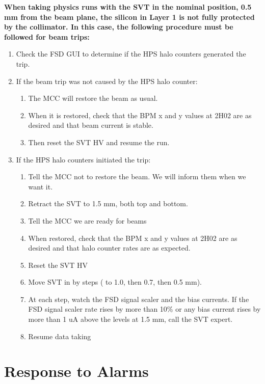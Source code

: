 \documentclass[12pt]{report}
\begin{document}
\textbf{When taking physics runs with the SVT in  the nominal position, 0.5 mm from the beam plane, the silicon in Layer 1 is not fully protected by the collimator.  In this case, the following procedure must be followed for beam trips:}
\begin{enumerate}
\item Check the FSD GUI to determine if the HPS halo counters generated the trip.
\item If the beam trip was not caused by the HPS halo counter:
\begin {enumerate}
\item The MCC will restore the beam as usual.
\item When it is restored, check that the BPM x and y values at 2H02 are as desired and that beam current is stable.
\item Then reset the SVT HV and resume the run.
\end{enumerate}
\item If the HPS halo counters initiated the trip:
\begin{enumerate}
\item Tell the MCC not to restore the beam. We will inform them when we want it.
\item Retract the SVT to 1.5 mm, both top and bottom.
\item Tell the MCC we are ready for beams
\item When restored, check that the BPM x and y values at 2H02 are as desired and that halo counter rates are as expected.
\item Reset the SVT HV
\item Move SVT in by steps ( to 1.0, then 0.7, then 0.5 mm). 
\item At each step, watch the FSD signal scaler and the bias currents. If the FSD signal scaler rate rises by more than 10\% or any bias current rises by more than 1 uA above the levels at 1.5 mm, call the SVT expert.
\item Resume data taking
\end{enumerate}
\end{enumerate}


\section{Response to Alarms}
\end{document}
